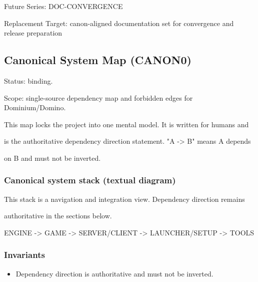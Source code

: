 \documentclass[9pt,a4paper,openany]{book}
\begin{document}
Future Series: DOC-\allowbreak{}CONVERGENCE

Replacement Target: canon-\allowbreak{}aligned documentation set for convergence and release preparation


\subsection{Canonical System Map (CANON0)}





Status: binding.\allowbreak{}



Scope: single-\allowbreak{}source dependency map and forbidden edges for Dominium/\allowbreak{}Domino.\allowbreak{}






This map locks the project into one mental model.\allowbreak{} It is written for humans and



is the authoritative dependency direction statement.\allowbreak{} "A -\allowbreak{}> B" means A depends



on B and must not be inverted.\allowbreak{}






\subsubsection{Canonical system stack (textual diagram)}


This stack is a navigation and integration view.\allowbreak{} Dependency direction remains



authoritative in the sections below.\allowbreak{}






ENGINE -\allowbreak{}> GAME -\allowbreak{}> SERVER/\allowbreak{}CLIENT -\allowbreak{}> LAUNCHER/\allowbreak{}SETUP -\allowbreak{}> TOOLS






\subsubsection{Invariants}


\begin{itemize}
\item Dependency direction is authoritative and must not be inverted.\allowbreak{}
\end{itemize}
\end{document}
